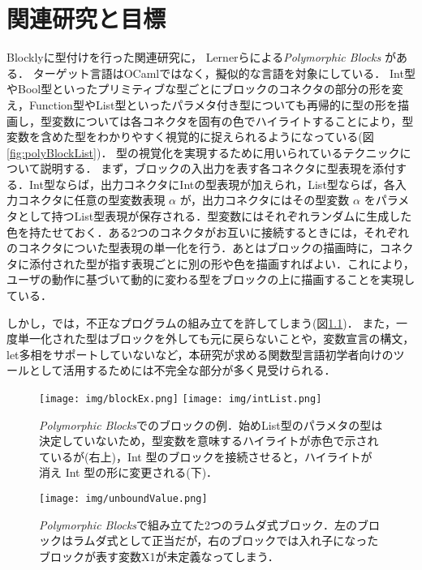 \chapter{関連研究と目標}\label{chap:senko}

Blocklyに型付けを行った関連研究に，
Lernerらによる{\it Polymorphic Blocks} \cite{Typed-Blockly}がある．
ターゲット言語はOCamlではなく，擬似的な言語を対象にしている．
Int型やBool型といったプリミティブな型ごとにブロックのコネクタの部分の形を変え，Function型やList型といったパラメタ付き型についても再帰的に型の形を描画し，型変数については各コネクタを固有の色でハイライトすることにより，型変数を含めた型をわかりやすく視覚的に捉えられるようになっている(図\ref{fig:polyBlockList})．
型の視覚化を実現するために用いられているテクニックについて説明する．
まず，ブロックの入出力を表す各コネクタに型表現を添付する．Int型ならば，出力コネクタにIntの型表現が加えられ，List型ならば，各入力コネクタに任意の型変数表現 $\alpha$ が，出力コネクタにはその型変数 $\alpha$ をパラメタとして持つList型表現が保存される．型変数にはそれぞれランダムに生成した色を持たせておく．ある2つのコネクタがお互いに接続するときには，それぞれのコネクタについた型表現の単一化を行う．あとはブロックの描画時に，コネクタに添付された型が指す表現ごとに別の形や色を描画すればよい．これにより，ユーザの動作に基づいて動的に変わる型をブロックの上に描画することを実現している．

しかし，\cite{Typed-Blockly}では，不正なプログラムの組み立てを許してしまう(図\ref{fig:unboundValue})．
また，一度単一化された型はブロックを外しても元に戻らないことや，変数宣言の構文，let多相\cite{AkaHon}をサポートしていないなど，本研究が求める関数型言語初学者向けのツールとして活用するためには不完全な部分が多く見受けられる．

\begin{figure}[t]
 \centering
 \texttt{[image: img/blockEx.png]}
 \texttt{[image: img/intList.png]} %
 \caption{{\it Polymorphic Blocks}でのブロックの例．始めList型のパラメタの型は決定していないため，型変数を意味するハイライトが赤色で示されているが(右上)，Int 型のブロックを接続させると，ハイライトが消え Int 型の形に変更される(下)．\label{fig:polyBlockList}}
 \texttt{[image: img/unboundValue.png]}
 \caption{{\it Polymorphic Blocks}で組み立てた2つのラムダ式ブロック．左のブロックはラムダ式として正当だが，右のブロックでは入れ子になったブロックが表す変数X1が未定義なってしまう．\label{fig:unboundValue}}
\end{figure}

